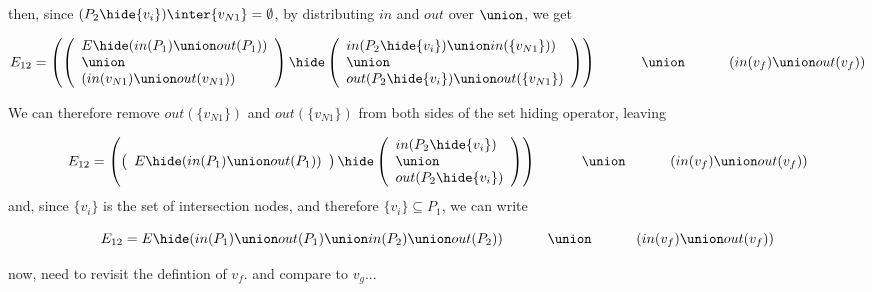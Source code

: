 \noindent
then, since $(P_2\hide\{v_i\}) \inter \{v_{N1}\} = \emptyset$, by distributing $in$ and $out$ over $\union$, we get  

\[
E_{12}  =  \left( \left(
  \begin{array}{l}
    E\hide(in(P_1) \union out(P_1)) \\  \union \\ (in(v_{N1}) \union out(v_{N1}) ) \\
  \end{array} \right)
   \hide
   \left( \begin{array}{l}
     in(P_2\hide\{v_i\})\union in(\{v_{N1}\})) \\\union\\ out(P_2\hide\{v_i\})\union out(\{v_{N1}\})
   \end{array}
   \right) \right) \\
   \hphantom{E_{12}  = \;\; }   \union\ \\
\hphantom{E_{12}  = \;\;}   (in(v_f) \union out(v_f))\\ 
\]

We can therefore remove $out(\{v_{N1}\})$ and $out(\{v_{N1}\})$ from both sides of the set hiding operator, leaving 

\[
E_{12}  =  \left( \left(
  \begin{array}{l}
    E\hide(in(P_1) \union out(P_1)) \\  
  \end{array} \right)
   \hide
   \left( \begin{array}{l}
     in(P_2\hide\{v_i\}) \\\union\\ out(P_2\hide\{v_i\})
   \end{array}
   \right) \right) \\
   \hphantom{E_{12}  = \;\; }   \union\ \\
\hphantom{E_{12}  = \;\;}   (in(v_f) \union out(v_f))\\ 
\]
and, since $\{v_i\}$ is the set of intersection nodes, and therefore $\{v_i\} \subseteq P_1$, we can write

\[
E_{12}  =  
   E\hide
  (
    in(P_1) \union out(P_1) \union in(P_2) \union out(P_2)
  ) \\
   \hphantom{E_{12}  = \;\;}   \union\ \\
\hphantom{E_{12}  = \;\;}   (in(v_f) \union out(v_f))\\ 
\]

now, need to revisit the defintion of $v_f$. and compare to $v_g$...

